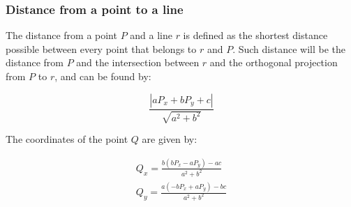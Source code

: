 \subsubsection{Distance from a point to a line}

The distance from a point $P$ and a line $r$ is defined as the shortest distance possible between every point that belongs to $r$ and $P$. Such distance will be the distance from $P$ and the intersection between $r$ and the orthogonal projection from $P$ to $r$, and can be found by:


\[
    \frac{|a P_x + b P_y +c|}{\sqrt{a^2+b^2}}
\]

The coordinates of the point $Q$ are given by:

\[
  \begin{array}{c}
    Q_x = \frac{b (b P_x - a P_y)-ac}{a^2+b^2} \\
    Q_y = \frac{a(-bP_x+aP_y)-bc}{a^2+b^2} \\
  \end{array}
\]


